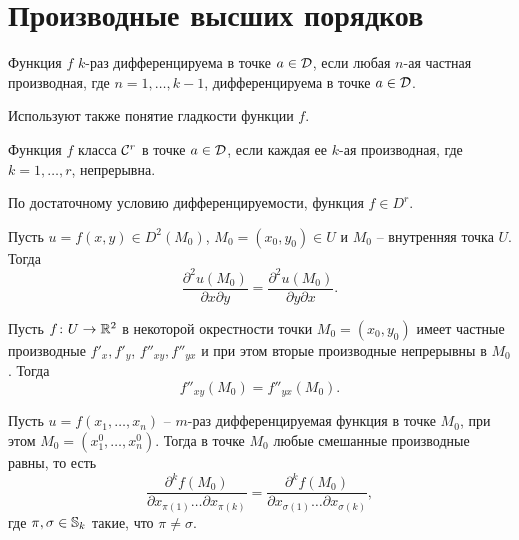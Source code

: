 	
	\section{Производные высших порядков}
	\begin{mdef}
		Функция $f$ $k$-раз дифференцируема в точке $a \in \mathcal{D}$, если любая $n$-ая частная производная, где $n=1,\ldots,k-1$, дифференцируема в точке $a \in \mathcal{D}$.
	\end{mdef}
	\begin{remark}
		Используют также понятие гладкости функции $f$. 
		
		Функция $f$ класса $\mathcal{C}^r$ в точке $a\in \mathcal{D}$, если каждая ее $k$-ая производная, где $k=1,\ldots,r$, непрерывна.
		
		По достаточному условию дифференцируемости, функция $f \in D^{r}$.
	\end{remark}

	\begin{theorem}\label{th1}
		Пусть $u = f(x,y) \in D^2(M_0)$, $M_0 = (x_0, y_0) \in U$ и $M_0$ -- внутренняя точка $U$.
		Тогда
		$$
		\frac {\partial^2 u(M_0)} {\partial x \partial y} = \frac {\partial^2 u(M_0)} {\partial y \partial x}.
		$$
	\end{theorem}

	\begin{theorem}
		Пусть $f\colon U \to \mathbb{R}^2$ в некоторой окрестности точки $M_0 = (x_0, y_0)$ имеет частные производные $f'_x, f'_y$, $f''_{xy}, f''_{yx}$ и при этом вторые производные непрерывны в $M_0$.
		Тогда
		$$
		f''_{xy}(M_0) = f''_{yx}(M_0).
		$$
	\end{theorem}

	\begin{corollary}
		Пусть $u = f(x_1, \ldots, x_n)$ -- $m$-раз дифференцируемая функция в точке $M_0$, при этом $M_0 = (x_1^0, \ldots, x_n^0)$.
		Тогда в точке $M_0$ любые смешанные производные равны, то есть
		$$
		\frac {\partial^k f(M_0)} {\partial x_{\pi(1)} \ldots \partial x_{\pi(k)}} = \frac {\partial^k f(M_0)} {\partial x_{\sigma(1)} \ldots \partial x_{\sigma(k)}},
		$$
		где $\pi, \sigma \in \mathbb{S}_k$ такие, что $\pi \not= \sigma$.
	\end{corollary}
